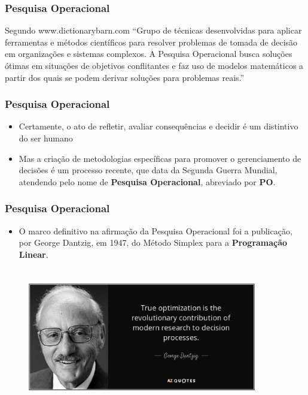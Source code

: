 \documentclass{beamer}
\begin{document}
\begin{frame}
	\frametitle{Pesquisa Operacional}
	\begin{block}{Segundo www.dictionarybarn.com}
	“Grupo de técnicas desenvolvidas para aplicar ferramentas e métodos científicos para resolver problemas de tomada de decisão em organizações e sistemas complexos. A Pesquisa Operacional busca soluções ótimas em situações de objetivos conflitantes e faz uso de modelos matemáticos a partir dos quais se podem derivar soluções para problemas reais.”
	\end{block}
\end{frame}

\begin{frame}
	\frametitle{Pesquisa Operacional}
	\begin{itemize}
	\item Certamente, o ato de refletir, avaliar consequências e decidir é um distintivo do ser humano 
	\item Mas a criação de metodologias específicas para promover o gerenciamento de decisões é um processo recente, que data da Segunda Guerra Mundial, atendendo pelo nome de \textbf{\color{red}Pesquisa Operacional}, abreviado por \textbf{\color{red}PO}.
	\end{itemize}
\end{frame}

\begin{frame}
	\frametitle{Pesquisa Operacional}
	\begin{itemize}
	\item O marco definitivo na afirmação da Pesquisa Operacional foi a publicação, por George Dantzig, em 1947, do Método Simplex para a \textbf{\color{red}Programação Linear}.
	\end{itemize}
	\begin{figure}
		\includegraphics[width=10cm, height=6cm]{dantzig.png}
	\end{figure}
\end{frame}
\end{document}
